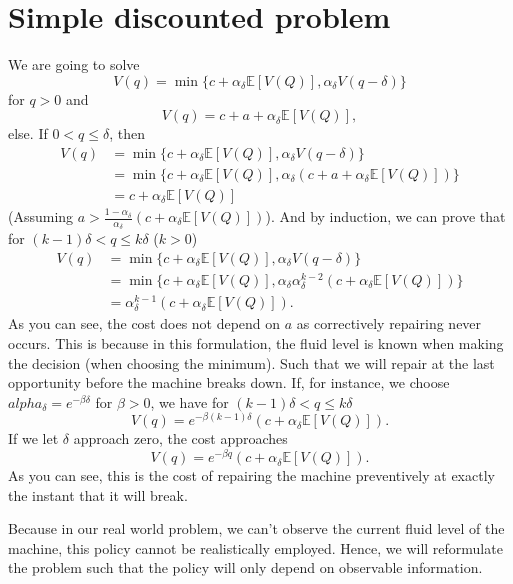 

\section{Simple discounted problem}
We are going to solve
$$
V(q)=\min\{
c+\alpha_{\delta} \mathbb{E}[V(Q)],
\alpha_{\delta} V(q-\delta)
\}
$$
for $q>0$ and
$$
V(q)=c + a + \alpha_{\delta} \mathbb{E}[V(Q)],
$$
else.
If $0<q\leq\delta$, then 
\begin{equation}\begin{split}
V(q)&=\min\{
c+\alpha_{\delta} \mathbb{E}[V(Q)],\alpha_{\delta} V(q-\delta)\}\\
&=\min\{
c+\alpha_{\delta} \mathbb{E}[V(Q)],\alpha_{\delta}(c+a+\alpha_{\delta} \mathbb{E}[V(Q)])\}\\
&=c+\alpha_{\delta} \mathbb{E}[V(Q)]
\end{split}
\end{equation}
(Assuming $a>\frac{1-\alpha_\delta}{\alpha_\delta}(c+\alpha_\delta\mathbb{E}[V(Q)])$).
And by induction, we can prove that for $(k-1)\delta<q\leq k\delta$ ($k>0$)
\begin{equation}\begin{split}
V(q)&=\min\{
c+\alpha_{\delta} \mathbb{E}[V(Q)],\alpha_{\delta} V(q-\delta)\}\\
&=\min\{
c+\alpha_{\delta} \mathbb{E}[V(Q)],\alpha_{\delta} \alpha_{\delta}^{k-2}(c+\alpha_\delta\mathbb{E}[V(Q)])\}\\
&=\alpha_{\delta}^{k-1}(c+\alpha_\delta\mathbb{E}[V(Q)]).
\end{split}
\end{equation}
As you can see, the cost does not depend on $a$ as correctively repairing never occurs. This is because in this formulation, the fluid level is known when making the decision (when choosing the minimum). Such that we will repair at the last opportunity before the machine breaks down.
If, for instance, we choose $alpha_\delta=e^{-\beta \delta}$ for $\beta>0$, we have for $(k-1)\delta<q\leq k\delta$
$$
V(q)=e^{-\beta(k-1)\delta}(c+\alpha_\delta\mathbb{E}[V(Q)]).
$$
If we let $\delta$ approach zero, the cost approaches 
$$
V(q)=e^{-\beta q}(c+\alpha_\delta\mathbb{E}[V(Q)]).
$$
As you can see, this is the cost of repairing the machine preventively at exactly the instant that it will break.

Because in our real world problem, we can't observe the current fluid level of the machine, this policy cannot be realistically employed. Hence, we will reformulate the problem such that the policy will only depend on observable information.
